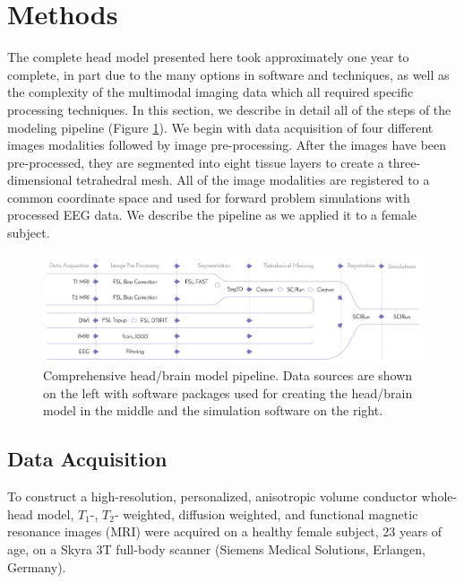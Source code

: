 
\section{Methods}
\label{sec:Methods}

The complete head model presented here took approximately one year to complete, in part due to the many options in software and techniques, as well as the complexity of the multimodal imaging data which all required specific processing techniques. In this section, we describe in detail all of the steps of the modeling pipeline (Figure \ref{fig:pipeline}). We begin with data acquisition of four different images modalities followed by image pre-processing. After the images have been pre-processed, they are segmented into eight tissue layers to create a three-dimensional tetrahedral mesh. All of the image modalities are registered to a common coordinate space and used for forward problem simulations with processed EEG data. We describe the pipeline as we applied it to a female subject. 

\begin{figure}[H]
    \centering
    \includegraphics[width=\textwidth]{Figures/pipeline}
    \caption{Comprehensive head/brain model pipeline. Data sources are shown on the left with software packages used for creating the head/brain model in the middle and the simulation software on the right.}
    \label{fig:pipeline}
\end{figure}

\subsection{Data Acquisition}
\label{sec:Data}


To construct a high-resolution, personalized, anisotropic volume conductor whole-head model, $T_1$-, $T_2$- weighted, diffusion weighted, and functional magnetic resonance images (MRI) were acquired on a healthy female subject, 23 years of age, on a Skyra 3T full-body scanner (Siemens Medical Solutions, Erlangen, Germany).

